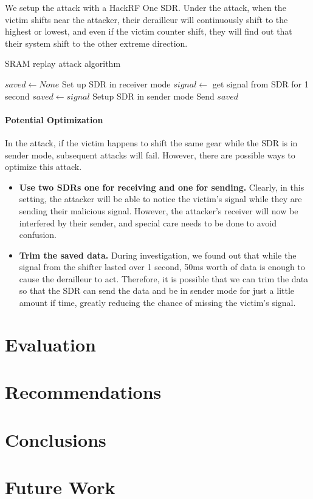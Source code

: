 \documentclass[letterpaper,twocolumn,10pt]{article}
\begin{document}
We setup the attack with a HackRF One SDR. Under the attack, when the victim shifts near the attacker, their derailleur will continuously shift to the highest or lowest, and even if the victim counter shift, they will find out that their system shift to the other extreme direction.
\begin{algorithm}
\caption{SRAM replay attack algorithm}\label{alg:cap}
\begin{algorithmic}[1]
  \State $saved \gets None$
    \State Set up SDR in receiver mode
    \State $signal \gets$ get signal from SDR for 1 second
        \State $saved \gets signal$
    \State Setup SDR in sender mode
    \State Send $saved$
    \EndIf 
  \EndWhile
  \end{algorithmic}
\end{algorithm}

\paragraph{Potential Optimization}
In the attack, if the victim happens to shift the same gear while the SDR is in sender mode, 
subsequent attacks will fail. However, there are possible ways to optimize this attack.
\begin{itemize}
  \item \textbf{Use two SDRs one for receiving and one for sending.} Clearly, in this setting, the attacker will be able to notice the victim's signal while they are sending their malicious signal. However, the attacker's receiver will now be interfered by their sender, and special care needs to be done to avoid confusion.
  \item \textbf{Trim the saved data.} During investigation, we found out that while the signal from the shifter lasted over 1 second, 50ms worth of data is enough to cause the derailleur to act. Therefore, it is possible that we can trim the data so that the SDR can send the data and be in sender mode for just a little amount if time, greatly reducing the chance of missing the victim's signal.
\end{itemize}


\section{Evaluation}


\section{Recommendations}


\section{Conclusions}




\section{Future Work}




 {\normalsize 
  }

\end{document}
